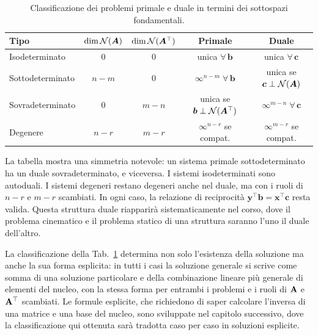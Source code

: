 \begin{table}[H]%
	\centering
	\small
	\renewcommand{\arraystretch}{1.4}
	\begin{tabular}{@{}lcccc@{}}
		\toprule
		\textbf{Tipo} & $\dim\mathcal{N}(\bm{A})$ & $\dim\mathcal{N}(\bm{A}^\top)$ & \textbf{Primale} & \textbf{Duale} \\
		\midrule
		Isodeterminato   & $0$   & $0$   & unica $\forall\,\bm{b}$ & unica $\forall\,\bm{c}$ \\
		Sottodeterminato & $n{-}m$ & $0$   & $\infty^{n-m}\;\forall\,\bm{b}$ & unica se $\bm{c}\perp\mathcal{N}(\bm{A})$ \\
		Sovradeterminato & $0$   & $m{-}n$ & unica se $\bm{b}\perp\mathcal{N}(\bm{A}^\top)$ & $\infty^{m-n}\;\forall\,\bm{c}$ \\
		Degenere         & $n{-}r$ & $m{-}r$ & $\infty^{n-r}$ se compat. & $\infty^{m-r}$ se compat. \\
		\bottomrule
	\end{tabular}
	\caption{Classificazione dei problemi primale e duale in termini dei sottospazi fondamentali.}
	\label{tab:primale_duale}
\end{table}

\begin{oss}
	La tabella mostra una simmetria notevole: un sistema primale sottodeterminato ha un duale sovradeterminato, e viceversa. I sistemi isodeterminati sono autoduali. I sistemi degeneri restano degeneri anche nel duale, ma con i ruoli di $n-r$ e $m-r$ scambiati. In ogni caso, la relazione di reciprocità $\bm{y}^\top\bm{b} = \bm{x}^\top\bm{c}$ resta valida. Questa struttura duale riapparirà sistematicamente nel corso, dove il problema cinematico e il problema statico di una struttura saranno l'uno il duale dell'altro.
\end{oss}


\begin{oss}
	La classificazione della Tab.~\ref{tab:primale_duale} determina non
	solo l'esistenza della soluzione ma anche la sua forma esplicita: in
	tutti i casi la soluzione generale si scrive come somma di una
	soluzione particolare e della combinazione lineare più generale di
	elementi del nucleo, con la stessa forma per entrambi i problemi e i
	ruoli di $\mathbf{A}$ e $\mathbf{A}^\top$ scambiati. Le formule esplicite,
	che richiedono di saper calcolare l'inversa di una matrice e una
	base del nucleo, sono sviluppate nel capitolo successivo, dove
	la classificazione qui ottenuta sarà tradotta caso per caso in
	soluzioni esplicite.
\end{oss}



